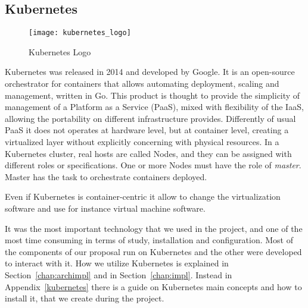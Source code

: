 \subsection{Kubernetes}
\begin{figure}[h]
  \centering \texttt{[image: kubernetes\_logo]}
  \caption{Kubernetes Logo}
  \label{chap:intro:img:k8s_logo}
\end{figure}
Kubernetes was released in 2014 and developed by Google. It is an open-source
orchestrator for containers that allows automating deployment, scaling and
management, written in Go. This product is thought to provide the simplicity of
management of a Platform as a Service (PaaS), mixed with flexibility of the
IaaS, allowing the portability on different infrastructure provides. Differently
of usual PaaS it does not operates at hardware level, but at container level,
creating a virtualized layer without explicitly concerning with physical
resources. In a Kubernetes cluster, real hosts are called Nodes, and they can be
assigned with different roles or specifications. One or more Nodes must have the
role of \emph{master}. Master has the task to orchestrate containers deployed. 

Even if Kubernetes is container-centric it allow to change the virtualization
software and use for instance virtual machine software.

It was the most important technology that we used in the project, and one of the
most time consuming in terms of study, installation and configuration. Most of
the components of our proposal run on Kubernetes and the other were developed to
interact with it. How we utilize Kubernetes is explained in
Section~\ref{chap:archimpl} and in Section~\ref{chap:impl}. Instead in
Appendix~\ref{kubernetes} there is a guide on Kubernetes main concepts and how
to install it, that we create during the project.


